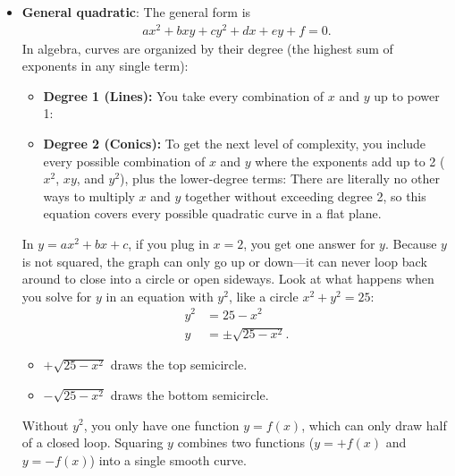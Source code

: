 \documentclass{report}
\begin{document}
\begin{itemize}
\begin{itemize}
            \end{itemize}
            Conics that pass through the circular points form circles because in homogeneous coordinates, the algebraic condition for a conic to contain \((1 : i : 0)\) and \((1 : -i : 0)\) forces its equation to take the exact form of a Euclidean circle.
        \item \textbf{General quadratic}: The general form is 
            \begin{align*}
                ax^{2} + bxy + cy^{2} + dx + ey + f = 0
            .\end{align*}
            In algebra, curves are organized by their degree (the highest sum of exponents in any single term):
            \begin{itemize}
                \item \textbf{Degree 1 (Lines):} You take every combination of \(x\) and \(y\) up to power 1:
                \item \textbf{Degree 2 (Conics):} To get the next level of complexity, you include every possible combination of \(x\) and \(y\) where the exponents add up to 2 (\(x^{2}\), \(xy\), and \(y^{2}\)), plus the lower-degree terms:
                    \bigbreak \noindent 
                    There are literally no other ways to multiply \(x\) and \(y\) together without exceeding degree 2, so this equation covers every possible quadratic curve in a flat plane.
            \end{itemize}
            In \(y = ax^2 + bx + c\), if you plug in \(x = 2\), you get one answer for \(y\). Because \(y\) is not squared, the graph can only go up or down—it can never loop back around to close into a circle or open sideways.
            \bigbreak \noindent 
            Look at what happens when you solve for \(y\) in an equation with \(y^{2}\), like a circle \(x^2 + y^2 = 25\):
            \begin{align*}
                y^{2} &= 25 -x^{2} \\
                y &= \pm \sqrt{25-x^{2}}
            .\end{align*}
            \begin{itemize}
                \item \(+\sqrt{25-x^{2}}\) draws the top semicircle.
                \item \(-\sqrt{25-x^{2}}\) draws the bottom semicircle.
            \end{itemize}
            Without \(y^{2}\), you only have one function \(y = f(x)\), which can only draw half of a closed loop. Squaring \(y\) combines two functions (\(y = +f(x)\) and \(y = -f(x)\)) into a single smooth curve.

\end{itemize}
\end{document}
